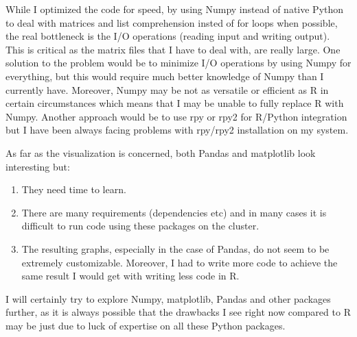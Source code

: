 \documentclass[a4paper, 11pt]{article} %
\begin{document}
While I optimized the code for speed, by using Numpy instead of
native Python to deal with matrices and list comprehension insted
of for loops when possible, the real bottleneck is the I/O operations
(reading input and writing output). This is critical as the matrix
files that I have to deal with, are really large. One solution to
the problem would be to minimize I/O operations by using Numpy
for everything, but this would require much better knowledge
of Numpy than I currently have. Moreover, Numpy may be not as versatile
or efficient as R in certain circumstances which means that 
I may be unable to fully replace R with Numpy. Another approach 
would be to use rpy or rpy2 for R/Python integration but I have been
always facing problems with rpy/rpy2 installation on my system.

As far as the visualization is concerned, both Pandas and matplotlib
look interesting but:

\begin{enumerate}
\item They need time to learn.  
\item There are many requirements (dependencies etc) and in many
cases it is difficult to run code using these packages on the cluster.
\item The resulting graphs, especially in the case of Pandas, do not
seem to be extremely customizable. Moreover, I had to write more
code to achieve the same result I would get with writing less
code in R.
\end{enumerate}

I will certainly try to explore Numpy, matplotlib, Pandas and other
packages further, as it is always possible that the drawbacks I see
right now compared to R may be just due to luck of expertise on all
these Python packages. 






\end{document}
